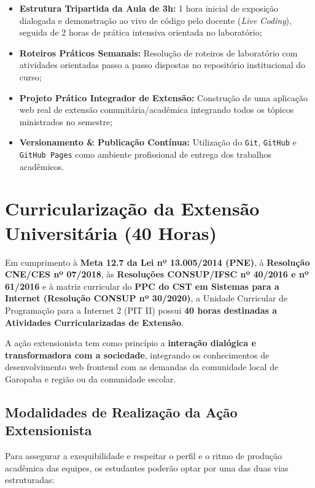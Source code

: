 \documentclass[12pt,a4paper]{article}
\begin{document}
\begin{itemize}[leftmargin=*]
    \item \textbf{Estrutura Tripartida da Aula de 3h:} 1 hora inicial de exposição dialogada e demonstração ao vivo de código pelo docente (\textit{Live Coding}), seguida de 2 horas de prática intensiva orientada no laboratório;
    \item \textbf{Roteiros Práticos Semanais:} Resolução de roteiros de laboratório com atividades orientadas passo a passo dispostas no repositório institucional do curso;
    \item \textbf{Projeto Prático Integrador de Extensão:} Construção de uma aplicação web real de extensão comunitária/acadêmica integrando todos os tópicos ministrados no semestre;
    \item \textbf{Versionamento \& Publicação Contínua:} Utilização do \texttt{Git}, \texttt{GitHub} e \texttt{GitHub Pages} como ambiente profissional de entrega dos trabalhos acadêmicos.
\end{itemize}

\section{Curricularização da Extensão Universitária (40 Horas)}

Em cumprimento à \textbf{Meta 12.7 da Lei nº 13.005/2014 (PNE)}, à \textbf{Resolução CNE/CES nº 07/2018}, às \textbf{Resoluções CONSUP/IFSC nº 40/2016 e nº 61/2016} e à matriz curricular do \textbf{PPC do CST em Sistemas para a Internet (Resolução CONSUP nº 30/2020)}, a Unidade Curricular de Programação para a Internet 2 (PIT II) possui \textbf{40 horas destinadas a Atividades Curricularizadas de Extensão}.

A ação extensionista tem como princípio a \textbf{interação dialógica e transformadora com a sociedade}, integrando os conhecimentos de desenvolvimento web frontend com as demandas da comunidade local de Garopaba e região ou da comunidade escolar.

\subsection{Modalidades de Realização da Ação Extensionista}
Para assegurar a exequibilidade e respeitar o perfil e o ritmo de produção acadêmica das equipes, os estudantes poderão optar por uma das duas vias estruturadas:
\end{document}
